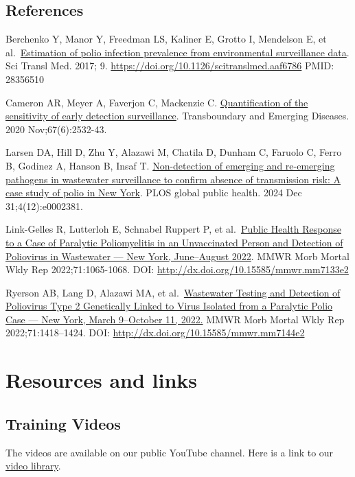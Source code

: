 \documentclass[
]{book}
\begin{document}
\section{References}\label{references}

Berchenko Y, Manor Y, Freedman LS, Kaliner E, Grotto I, Mendelson E, et al.~\href{https://doi.org/10.1126/scitranslmed.aaf6786}{Estimation of polio infection prevalence from environmental surveillance data}. Sci Transl Med. 2017; 9. \url{https://doi.org/10.1126/scitranslmed.aaf6786} PMID: 28356510

Cameron AR, Meyer A, Faverjon C, Mackenzie C. \href{https://doi.org/10.1111/tbed.13598}{Quantification of the sensitivity of early detection surveillance}. Transboundary and Emerging Diseases. 2020 Nov;67(6):2532-43.

Larsen DA, Hill D, Zhu Y, Alazawi M, Chatila D, Dunham C, Faruolo C, Ferro B, Godinez A, Hanson B, Insaf T. \href{https://doi.org/10.1371/journal.pgph.0002381}{Non-detection of emerging and re-emerging pathogens in wastewater surveillance to confirm absence of transmission risk: A case study of polio in New York}. PLOS global public health. 2024 Dec 31;4(12):e0002381.

Link-Gelles R, Lutterloh E, Schnabel Ruppert P, et al.~\href{https://www.cdc.gov/mmwr/volumes/71/wr/mm7133e2.htm?s_cid\%3Dmm7133e2_w}{Public Health Response to a Case of Paralytic Poliomyelitis in an Unvaccinated Person and Detection of Poliovirus in Wastewater --- New York, June--August 2022}. MMWR Morb Mortal Wkly Rep 2022;71:1065-1068. DOI: \url{http://dx.doi.org/10.15585/mmwr.mm7133e2}

Ryerson AB, Lang D, Alazawi MA, et al.~\href{https://www.cdc.gov/mmwr/volumes/71/wr/mm7144e2.htm}{Wastewater Testing and Detection of Poliovirus Type 2 Genetically Linked to Virus Isolated from a Paralytic Polio Case --- New York, March 9--October 11, 2022.} MMWR Morb Mortal Wkly Rep 2022;71:1418--1424. DOI: \url{http://dx.doi.org/10.15585/mmwr.mm7144e2}

\chapter{Resources and links}\label{resources-and-links}

\section{Training Videos}\label{training-videos}

The videos are available on our public YouTube channel. Here is a link to our \href{https://www.youtube.com/@NYSWastewaterSurveillance/featured}{video library}.
\end{document}
